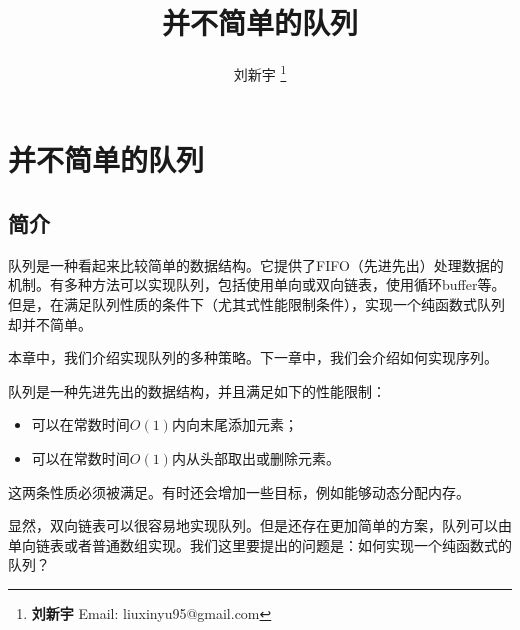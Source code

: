 \documentclass[UTF8]{article}
\begin{document}


\title{并不简单的队列}

\author{刘新宇
\thanks{{\bfseries 刘新宇 } \newline
  Email: liuxinyu95@gmail.com \newline}
  }

\maketitle
\fi


\ifx\wholebook\relax
\chapter{并不简单的队列}
\fi

\section{简介}
\label{introduction}

队列是一种看起来比较简单的数据结构。它提供了FIFO（先进先出）处理数据的机制。有多种方法可以实现队列，包括使用单向或双向链表，使用循环buffer等。但是，在满足队列性质的条件下（尤其式性能限制条件），实现一个纯函数式队列却并不简单。

本章中，我们介绍实现队列的多种策略。下一章中，我们会介绍如何实现序列。

队列是一种先进先出的数据结构，并且满足如下的性能限制：

\begin{itemize}
\item 可以在常数时间$O(1)$内向末尾添加元素；
\item 可以在常数时间$O(1)$内从头部取出或删除元素。
\end{itemize}

这两条性质必须被满足。有时还会增加一些目标，例如能够动态分配内存。

显然，双向链表可以很容易地实现队列。但是还存在更加简单的方案，队列可以由单向链表或者普通数组实现。我们这里要提出的问题是：如何实现一个纯函数式的队列？
\end{document}
